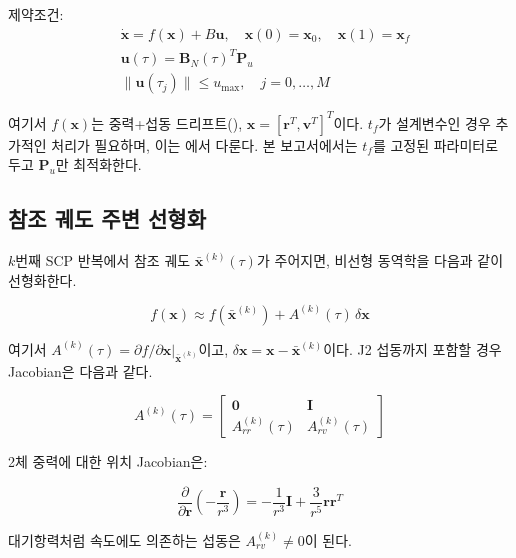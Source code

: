 \documentclass[11pt]{article}
\begin{document}
제약조건:
\begin{align}
  &\dot{\mathbf{x}} = f(\mathbf{x}) + B\mathbf{u},
  \quad \mathbf{x}(0) = \mathbf{x}_0,\quad \mathbf{x}(1) = \mathbf{x}_f \label{eq:dyn_constraint}\\
  &\mathbf{u}(\tau) = \mathbf{B}_N(\tau)^T \mathbf{P}_u \label{eq:bezier_constraint}\\
  &\|\mathbf{u}(\tau_j)\| \leq u_{\max},\quad j = 0,\ldots,M \label{eq:thrust_constraint}
\end{align}

여기서 $f(\mathbf{x})$는 중력+섭동 드리프트(\cite{report002}),
$\mathbf{x} = [\mathbf{r}^T, \mathbf{v}^T]^T$이다.
$t_f$가 설계변수인 경우 추가적인 처리가 필요하며, 이는 \cite{report007}에서 다룬다.
본 보고서에서는 $t_f$를 고정된 파라미터로 두고 $\mathbf{P}_u$만 최적화한다.

\subsection{참조 궤도 주변 선형화}

$k$번째 SCP 반복에서 참조 궤도 $\bar{\mathbf{x}}^{(k)}(\tau)$가 주어지면,
비선형 동역학을 다음과 같이 선형화한다.

\begin{equation}
  f(\mathbf{x}) \approx f(\bar{\mathbf{x}}^{(k)}) + A^{(k)}(\tau)\,\delta\mathbf{x}
  \label{eq:linearization}
\end{equation}

여기서 $A^{(k)}(\tau) = \partial f/\partial \mathbf{x}|_{\bar{\mathbf{x}}^{(k)}}$이고,
$\delta\mathbf{x} = \mathbf{x} - \bar{\mathbf{x}}^{(k)}$이다.
J2 섭동까지 포함할 경우 Jacobian은 다음과 같다.

\begin{equation}
  A^{(k)}(\tau) =
  \begin{bmatrix}
    \mathbf{0} & \mathbf{I} \\
    A_{rr}^{(k)}(\tau) & A_{rv}^{(k)}(\tau)
  \end{bmatrix}
  \label{eq:jacobian}
\end{equation}

2체 중력에 대한 위치 Jacobian은:

\begin{equation}
  \frac{\partial}{\partial\mathbf{r}}\!\left(-\frac{\mathbf{r}}{r^3}\right)
  = -\frac{1}{r^3}\mathbf{I} + \frac{3}{r^5}\mathbf{r}\mathbf{r}^T
  \label{eq:gravity_jacobian}
\end{equation}

대기항력처럼 속도에도 의존하는 섭동은 $A_{rv}^{(k)} \neq 0$이 된다.
\end{document}
